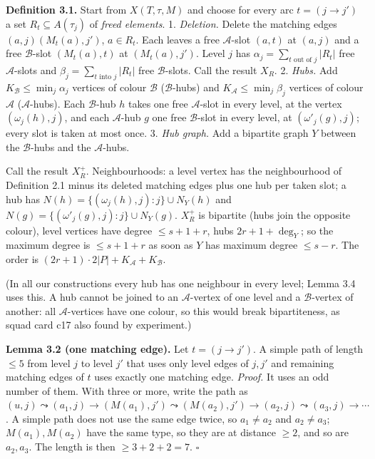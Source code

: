 \documentclass[
  11pt,
]{article}
\begin{document}
\textbf{Definition 3.1.} Start from \(X(T,\tau,M)\) and choose for every
arc \(t = (j\to j')\) a set \(R_t\subseteq A(\tau_j)\) of \emph{freed
elements}. 1. \emph{Deletion.} Delete the matching edges
\((a,j)(M_t(a),j')\), \(a\in R_t\). Each leaves a free
\(\mathcal A\)-slot \((a,t)\) at \((a,j)\) and a free
\(\mathcal B\)-slot \((M_t(a),t)\) at \((M_t(a),j')\). Level \(j\) has
\(\alpha_j = \sum_{t\text{ out of }j}|R_t|\) free \(\mathcal A\)-slots
and \(\beta_j = \sum_{t\text{ into }j}|R_t|\) free \(\mathcal B\)-slots.
Call the result \(X_R\). 2. \emph{Hubs.} Add
\(K_{\mathcal B}\le\min_j\alpha_j\) vertices of colour \(\mathcal B\)
(\(\mathcal B\)-hubs) and \(K_{\mathcal A}\le\min_j\beta_j\) vertices of
colour \(\mathcal A\) (\(\mathcal A\)-hubs). Each \(\mathcal B\)-hub
\(h\) takes one free \(\mathcal A\)-slot in every level, at the vertex
\((\omega_j(h),j)\), and each \(\mathcal A\)-hub \(g\) one free
\(\mathcal B\)-slot in every level, at \((\omega'_j(g),j)\); every slot
is taken at most once. 3. \emph{Hub graph.} Add a bipartite graph \(Y\)
between the \(\mathcal B\)-hubs and the \(\mathcal A\)-hubs.

Call the result \(X_R^+\). Neighbourhoods: a level vertex has the
neighbourhood of Definition 2.1 minus its deleted matching edges plus
one hub per taken slot; a hub has
\(N(h) = \{(\omega_j(h),j): j\}\cup N_Y(h)\) and
\(N(g) = \{(\omega'_j(g),j): j\}\cup N_Y(g)\). \(X_R^+\) is bipartite
(hubs join the opposite colour), level vertices have degree
\(\le s+1+r\), hubs \(2r+1+\deg_Y\); so the maximum degree is
\(\le s+1+r\) as soon as \(Y\) has maximum degree \(\le s-r\). The order
is \((2r+1)\cdot 2|P|+K_{\mathcal A}+K_{\mathcal B}\).

(In all our constructions every hub has one neighbour in every level;
Lemma 3.4 uses this. A hub cannot be joined to an \(\mathcal A\)-vertex
of one level and a \(\mathcal B\)-vertex of another: all
\(\mathcal A\)-vertices have one colour, so this would break
bipartiteness, as squad card c17 also found by experiment.)

\textbf{Lemma 3.2 (one matching edge).} Let \(t = (j\to j')\). A simple
path of length \(\le 5\) from level \(j\) to level \(j'\) that uses only
level edges of \(j,j'\) and remaining matching edges of \(t\) uses
exactly one matching edge. \emph{Proof.} It uses an odd number of them.
With three or more, write the path as
\((u,j)\leadsto(a_1,j)\to(M(a_1),j')\leadsto(M(a_2),j')\to(a_2,j)\leadsto(a_3,j)\to\cdots\).
A simple path does not use the same edge twice, so \(a_1\ne a_2\) and
\(a_2\ne a_3\); \(M(a_1), M(a_2)\) have the same type, so they are at
distance \(\ge 2\), and so are \(a_2,a_3\). The length is then
\(\ge 3+2+2 = 7\). \(\square\)
\end{document}
